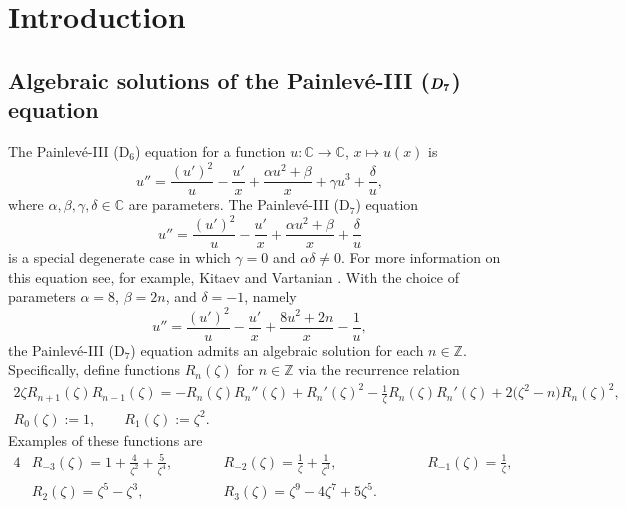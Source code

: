 \documentclass[11pt]{article}
\numberwithin{equation}{section}
\numberwithin{equation}{section}
\begin{document}
\section{Introduction}

\subsection[Algebraic solutions of the Painlev\'e-III (D\_7) equation]{Algebraic solutions of the Painlev\'e-III ($\boldsymbol{{\rm D}_7}$) equation}

The Painlev\'e-III (D$_6$) equation for a function
$u\colon\mathbb{C}\to\mathbb{C}$, $x\mapsto u(x)$ is
\begin{equation*}
u'' = \frac{(u')^2}{u}-\frac{u'}{x}+\frac{\alpha u^2+\beta}{x}+\gamma u^3+\frac{\delta}{u},
\end{equation*}
where $\alpha,\beta,\gamma,\delta\in\mathbb{C}$ are parameters.
The Painlev\'e-III (D$_7$) equation
\begin{equation*}
u'' = \frac{(u')^2}{u}-\frac{u'}{x}+\frac{\alpha u^2+\beta}{x}+\frac{\delta}{u}
\end{equation*}
is a special degenerate case in which $\gamma=0$ and $\alpha\delta\neq 0$.
For more information on this equation see, for example, Kitaev and Vartanian
\cite{KitaevV:2004}.
With the choice of parameters $\alpha=8$, $\beta=2n$, and $\delta=-1$, namely
\begin{equation}
\label{p3d7}
u'' = \frac{(u')^2}{u}-\frac{u'}{x}+\frac{8u^2+2n}{x}-\frac{1}{u},
\end{equation}
the Painlev\'e-III (D$_7$) equation admits an algebraic solution for each
$n\in\mathbb{Z}$.
Specifically, define functions $R_n(\zeta)$ for $n\in\mathbb{Z}$ via
the recurrence relation
\begin{gather*}
 2\zeta R_{n+1}(\zeta)R_{n-1}(\zeta) = -R_n(\zeta)R_n''(\zeta)+R_n'(\zeta)^2
-\frac{1}{\zeta}R_n(\zeta)R_n'(\zeta)+2\bigl(\zeta^2-n\bigr)R_n(\zeta)^2, \\
 R_0(\zeta):=1, \qquad R_1(\zeta):=\zeta^2.
\end{gather*}
Examples of these functions are
\begin{alignat*}{4}
& R_{-3}(\zeta) = 1 + \frac{4}{\zeta^2} + \frac{5}{\zeta^4}, \qquad &&
R_{-2}(\zeta) = \frac{1}{\zeta} + \frac{1}{\zeta^3}, \qquad &&
R_{-1}(\zeta) = \frac{1}{\zeta},& \\
& R_2(\zeta) = \zeta^5-\zeta^3, \qquad &&
R_3(\zeta) = \zeta^9 - 4\zeta^7 + 5\zeta^5. \qquad &
\end{alignat*}
\end{document}
